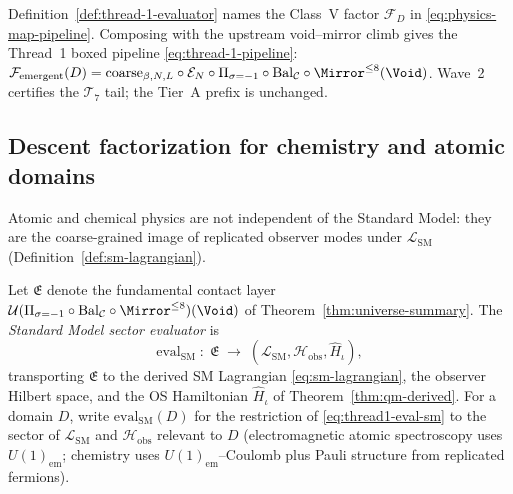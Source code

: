 \begin{remark}
Definition~\ref{def:thread-1-evaluator} names the Class~V factor
$\mathcal{F}_D$ in \eqref{eq:physics-map-pipeline}. Composing with the
upstream void--mirror climb gives the Thread~1 boxed pipeline
\eqref{eq:thread-1-pipeline}:
$\mathcal{F}_{\mathrm{emergent}}(D)=\mathrm{coarse}_{\beta,N,L}\circ\mathcal{E}_N
\circ\Pi_{\sigma=-1}\circ\mathrm{Bal}_{\mathcal{C}}\circ\Mirror^{\leq 8}(\Void)$.
Wave~2 certifies the $\mathcal{T}_7$ tail; the Tier~A prefix is unchanged.
\end{remark}

\subsection{Descent factorization for chemistry and atomic domains}
\label{sec:wave2-thread1:descent}

Atomic and chemical physics are not independent of the Standard Model: they are
the coarse-grained image of replicated observer modes under
$\mathcal{L}_{\mathrm{SM}}$ (Definition~\ref{def:sm-lagrangian}).

\begin{definition}
\label{def:thread1-eval-sm}
Let $\mathfrak{E}$ denote the fundamental contact layer
$\mathcal{U}(\Pi_{\sigma=-1}\circ\mathrm{Bal}_{\mathcal{C}}\circ\Mirror^{\leq 8})
(\Void)$ of Theorem~\ref{thm:universe-summary}. The \emph{Standard Model
sector evaluator} is
\begin{equation}\label{eq:thread1-eval-sm}
  \mathrm{eval}_{\mathrm{SM}}
  \;:\;
  \mathfrak{E}
  \;\longrightarrow\;
  (\mathcal{L}_{\mathrm{SM}},\mathcal{H}_{\mathrm{obs}},\hat H_\iota),
\end{equation}
transporting $\mathfrak{E}$ to the derived SM Lagrangian
\eqref{eq:sm-lagrangian}, the observer Hilbert space, and the OS Hamiltonian
$\hat H_\iota$ of Theorem~\ref{thm:qm-derived}. For a domain $D$, write
$\mathrm{eval}_{\mathrm{SM}}(D)$ for the restriction of
\eqref{eq:thread1-eval-sm} to the sector of $\mathcal{L}_{\mathrm{SM}}$ and
$\mathcal{H}_{\mathrm{obs}}$ relevant to $D$ (electromagnetic atomic
spectroscopy uses $U(1)_{\mathrm{em}}$; chemistry uses
$U(1)_{\mathrm{em}}$--Coulomb plus Pauli structure from replicated fermions).
\end{definition}

